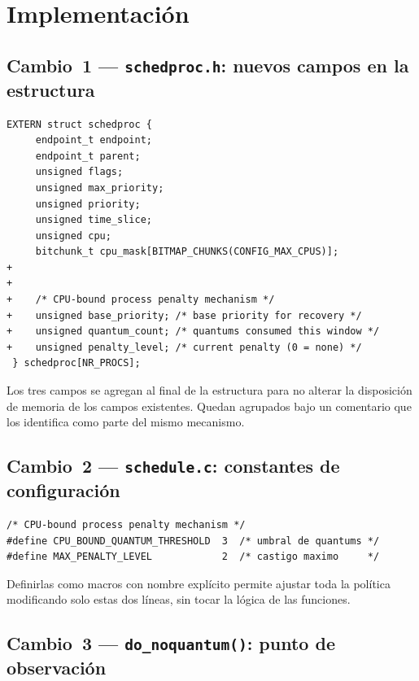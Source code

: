 \documentclass[11pt,a4paper]{article}
\begin{document}
\section{Implementaci\'on}

\subsection{Cambio~1 --- \texttt{schedproc.h}: nuevos campos en la estructura}

\begin{lstlisting}[style=diffstyle,caption={Diff de \texttt{schedproc.h}}]
 EXTERN struct schedproc {
     endpoint_t endpoint;
     endpoint_t parent;
     unsigned flags;
     unsigned max_priority;
     unsigned priority;
     unsigned time_slice;
     unsigned cpu;
     bitchunk_t cpu_mask[BITMAP_CHUNKS(CONFIG_MAX_CPUS)];
+
+
+    /* CPU-bound process penalty mechanism */
+    unsigned base_priority; /* base priority for recovery */
+    unsigned quantum_count; /* quantums consumed this window */
+    unsigned penalty_level; /* current penalty (0 = none) */
 } schedproc[NR_PROCS];
\end{lstlisting}

Los tres campos se agregan al final de la estructura para no alterar la disposici\'on
de memoria de los campos existentes. Quedan agrupados bajo un comentario que los
identifica como parte del mismo mecanismo.

\subsection{Cambio~2 --- \texttt{schedule.c}: constantes de configuraci\'on}

\begin{lstlisting}[style=cstyle,caption={Constantes de la pol\'itica}]
/* CPU-bound process penalty mechanism */
#define CPU_BOUND_QUANTUM_THRESHOLD  3  /* umbral de quantums */
#define MAX_PENALTY_LEVEL            2  /* castigo maximo     */
\end{lstlisting}

Definirlas como macros con nombre expl\'icito permite ajustar toda la pol\'itica
modificando solo estas dos l\'ineas, sin tocar la l\'ogica de las funciones.

\subsection{Cambio~3 --- \texttt{do\_noquantum()}: punto de observaci\'on}
\end{document}
